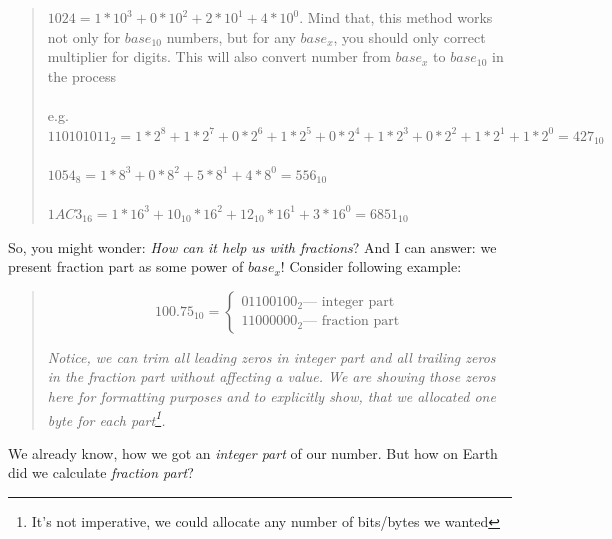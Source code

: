 \documentclass{report}
\begin{document}
            \begin{quote}
                $1024 = 1 * 10^3 + 0 * 10^2 + 2 * 10^1 + 4 * 10^0$. Mind that, this method works not only for $base_{10}$ numbers, but for any $base_x$, you should only correct
                multiplier for digits. This will also convert number from $base_x$ to $base_{10}$ in the process\\\\
                e.g.\\
                $110101011_2 = 1 * 2^8 + 1 * 2^7 + 0 * 2^6 + 1 * 2^5 + 0 * 2^4 + 1 * 2^3 + 0 * 2^2 + 1 * 2^1 + 1 * 2^0 = 427_{10}$ \\\\                    
                $1054_8 = 1 * 8^3 + 0 * 8^2 + 5 * 8^1 + 4 * 8^0 = 556_{10}$\\\\
                $1AC3_{16} = 1 * 16^3 + 10_{10} * 16^2 + 12_{10} * 16^1 + 3 * 16^0 = 6851_{10}$
            \end{quote}

            So, you might wonder: \emph{How can it help us with fractions}? And I can answer: we present fraction part as some power of $base_x$! Consider following
            example:

            \begin{quote}
                \begin{equation*}
                    100.75_{10} = \begin{cases}
                            01100100_2 \text{--- integer part}\\
                            11000000_2 \text{--- fraction part}
                        \end{cases}
                    \end{equation*}

                    \emph{
                        Notice, we can trim all leading zeros in \emph{integer part} and all trailing zeros in the \emph{fraction part} without affecting a value.
                        We are showing those zeros here for formatting purposes and to explicitly show, that we allocated one byte for each part\footnote{It's not imperative,
                        we could allocate any number of bits/bytes we wanted}.
                    }
            \end{quote}
            
            We already know, how we got an \emph{integer part} of our number. But how on Earth did we calculate \emph{fraction part}?
\end{document}
